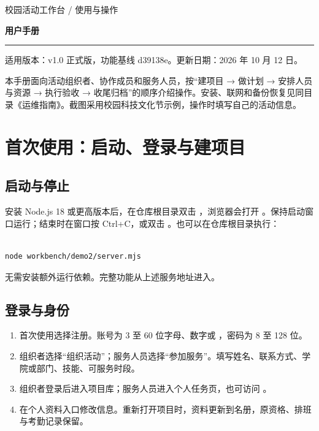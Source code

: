 \documentclass[UTF8,fontset=windows,zihao=-4,a4paper]{ctexart}
\begin{document}
{\small\color{Muted}校园活动工作台 / 使用与操作}\par\vspace{4pt}
{\huge\bfseries\color{Green}用户手册}\par\vspace{5pt}
{\color{Green}\rule{\linewidth}{1.2pt}}\par
适用版本：v1.0 正式版，功能基线 d39138e。更新日期：2026 年 10 月 12 日。


本手册面向活动组织者、协作成员和服务人员，按“建项目 → 做计划 → 安排人员与资源 → 执行验收 → 收尾归档”的顺序介绍操作。安装、联网和备份恢复见同目录《运维指南》。截图采用校园科技文化节示例，操作时填写自己的活动信息。


\section{首次使用：启动、登录与建项目}\label{sec:1}

\subsection*{启动与停止}

安装 Node.js 18 或更高版本后，在仓库根目录双击 ，浏览器会打开 {\def\UrlBreaks{\do\/}}。保持启动窗口运行；结束时在窗口按 Ctrl+C，或双击 。也可以在仓库根目录执行：



\begin{Verbatim}[fontsize=\small,breaklines=true,breakanywhere=true,frame=single,rulecolor=\color{Rule},framesep=7pt]

node workbench/demo2/server.mjs

\end{Verbatim}

无需安装额外运行依赖。完整功能从上述服务地址进入。


\subsection*{登录与身份}

\begin{enumerate}[start=1]

\item 首次使用选择注册。账号为 3 至 60 位字母、数字或 ，密码为 8 至 128 位。

\item 组织者选择“组织活动”；服务人员选择“参加服务”。填写姓名、联系方式、学院或部门、技能、可服务时段。

\item 组织者登录后进入项目库；服务人员进入个人任务页，也可访问 {\def\UrlBreaks{\do\/}}。

\item 在个人资料入口修改信息。重新打开项目时，资料更新到名册，原资格、排班与考勤记录保留。

\end{enumerate}
\end{document}
